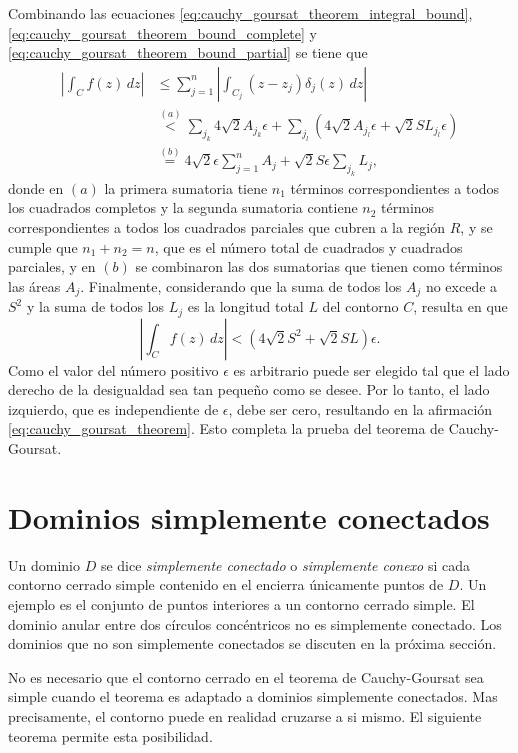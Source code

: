 \documentclass[a4paper]{report}
\begin{document}
Combinando las ecuaciones \ref{eq:cauchy_goursat_theorem_integral_bound}, \ref{eq:cauchy_goursat_theorem_bound_complete} y \ref{eq:cauchy_goursat_theorem_bound_partial} se tiene que 
\begin{align*}
 \left|\int_Cf(z)\,dz\right|&\leq\sum_{j=1}^n\left|\int_{C_j}(z-z_j)\delta_j(z)\,dz\right|\\
  &\overset{(a)}{<}\sum_{j_k}4\sqrt{2}A_{j_k}\epsilon+\sum_{j_l}\left(4\sqrt{2}A_{j_l}\epsilon+\sqrt{2}SL_{j_l}\epsilon\right)\\
  &\overset{(b)}{=}4\sqrt{2}\epsilon\sum_{j=1}^{n}A_j+\sqrt{2}S\epsilon\sum_{j_k}L_j,
\end{align*}
donde en \((a)\) la primera sumatoria tiene \(n_1\) términos correspondientes a todos los cuadrados completos y la segunda sumatoria contiene \(n_2\) términos correspondientes a todos los cuadrados parciales que cubren a la región \(R\), y se cumple que \(n_1+n_2=n\), que es el número total de cuadrados y cuadrados parciales, y en \((b)\) se combinaron las dos sumatorias que tienen como términos las áreas \(A_j\). Finalmente, considerando que la suma de todos los \(A_j\) no excede a \(S^2\) y la suma de todos los \(L_j\) es la longitud total \(L\) del contorno \(C\), resulta en que 
\[
 \left|\int_Cf(z)\,dz\right|<\left(4\sqrt{2}S^2+\sqrt{2}SL\right)\epsilon.
\]
Como el valor del número positivo \(\epsilon\) es arbitrario puede ser elegido tal que el lado derecho de la desigualdad sea tan pequeño como se desee. Por lo tanto, el lado izquierdo, que es independiente de \(\epsilon\), debe ser cero, resultando en la afirmación \ref{eq:cauchy_goursat_theorem}. Esto completa la prueba del teorema de Cauchy-Goursat.

\section{Dominios simplemente conectados}\label{sec:simply_connected_domains}

Un dominio \(D\) se dice \emph{simplemente conectado} o \emph{simplemente conexo} si cada contorno cerrado simple contenido en el encierra únicamente puntos de \(D\). Un ejemplo es el conjunto de puntos interiores a un contorno cerrado simple. El dominio anular entre dos círculos concéntricos no es simplemente conectado. Los dominios que no son simplemente conectados se discuten en la próxima sección.

No es necesario que el contorno cerrado en el teorema de Cauchy-Goursat sea simple cuando el teorema es adaptado a dominios simplemente conectados. Mas precisamente, el contorno puede en realidad cruzarse a si mismo. El siguiente teorema permite esta posibilidad.
\end{document}
